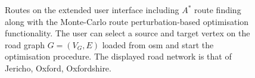 \documentclass{prettytex/ox/mmsc-special-topic}
\begin{document}
  \begin{figure}[H]
    \captionsetup[subfigure]{justification=centering}
    \centering
    \hfill
    \par
    \vspace{0.5cm}
    \hfill
    \par
    \caption{Routes on the extended user interface including $A^*$ route finding along with the Monte-Carlo route perturbation-based optimisation functionality. The user can select a source and target vertex on the road graph $G = (V_G, E)$ loaded from \gls{osm} and start the optimisation procedure. The displayed road network is that of Jericho, Oxford, Oxfordshire.}
    \label{fig:perturbations}
  \end{figure}
\end{document}
